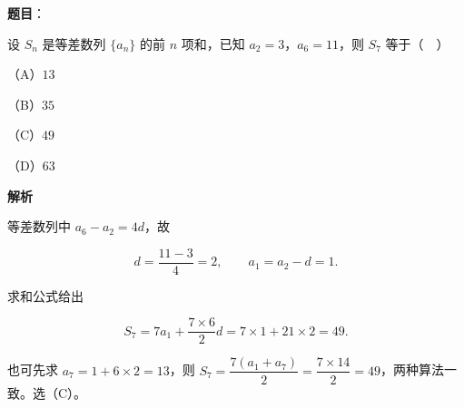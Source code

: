 \begin{answer}

\textbf{题目}：

设 $S_n$ 是等差数列 $\{a_n\}$ 的前 $n$ 项和，已知 $a_2=3$，$a_6=11$，则 $S_7$ 等于（　）

（A）$13$

（B）$35$

（C）$49$

（D）$63$

\textbf{解析}

等差数列中 $a_6-a_2=4d$，故

\nopagebreak[4]
\[d=\frac{11-3}{4}=2,\qquad a_1=a_2-d=1.\]

求和公式给出

\nopagebreak[4]
\[S_7=7a_1+\frac{7\times6}{2}d=7\times1+21\times2=49.\]

也可先求 $a_7=1+6\times2=13$，则 $S_7=\dfrac{7(a_1+a_7)}{2}=\dfrac{7\times14}{2}=49$，两种算法一致。选（C）。


\end{answer}
